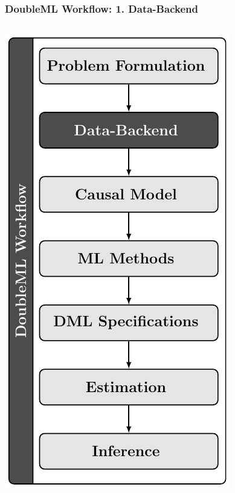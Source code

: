 \begin{frame}[fragile]
\frametitle{DoubleML Workflow: 1. Data-Backend}
\begin{columns}
\begin{column}{0.3\textwidth}
\includegraphics[width = \textwidth]{workflow/doubleml_workflow_data.pdf}

\end{column}
\end{columns}
\end{frame}
